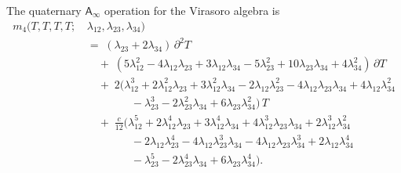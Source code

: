 \documentclass[11pt]{article}
\newcommand{\Ainf}{\mathsf{A}_{\infty}}
\begin{document}
\begin{theorem}
\label{thm:vir-m4-wn}
The quaternary $\Ainf$ operation for the Virasoro algebra is
\begin{equation}\label{eq:m4-virasoro-wn}
\boxed{
\begin{aligned}
m_4(T,T,T,T;\,&\lambda_{12},\lambda_{23},\lambda_{34})
\\[3pt]
&=\;
(\lambda_{23} + 2\lambda_{34})\,\partial^2 T
\\[3pt]
&\quad +\;
(5\lambda_{12}^2 - 4\lambda_{12}\lambda_{23}
  + 3\lambda_{12}\lambda_{34}
  - 5\lambda_{23}^2 + 10\lambda_{23}\lambda_{34}
  + 4\lambda_{34}^2)\,\partial T
\\[3pt]
&\quad +\;
2(\lambda_{12}^3 + 2\lambda_{12}^2\lambda_{23}
  + 3\lambda_{12}^2\lambda_{34}
  - 2\lambda_{12}\lambda_{23}^2
  - 4\lambda_{12}\lambda_{23}\lambda_{34}
  + 4\lambda_{12}\lambda_{34}^2
\\
&\qquad\qquad
  - \lambda_{23}^3 - 2\lambda_{23}^2\lambda_{34}
  + 6\lambda_{23}\lambda_{34}^2)\,T
\\[3pt]
&\quad +\;
\frac{c}{12}
(\lambda_{12}^5 + 2\lambda_{12}^4\lambda_{23}
  + 3\lambda_{12}^4\lambda_{34}
  + 4\lambda_{12}^3\lambda_{23}\lambda_{34}
  + 2\lambda_{12}^3\lambda_{34}^2
\\
&\qquad\qquad
  - 2\lambda_{12}\lambda_{23}^4
  - 4\lambda_{12}\lambda_{23}^3\lambda_{34}
  - 4\lambda_{12}\lambda_{23}\lambda_{34}^3
  + 2\lambda_{12}\lambda_{34}^4
\\
&\qquad\qquad
  - \lambda_{23}^5 - 2\lambda_{23}^4\lambda_{34}
  + 6\lambda_{23}\lambda_{34}^4).
\end{aligned}}
\end{equation}
\end{theorem}
\end{document}
